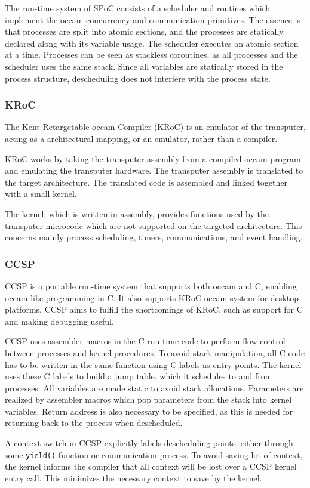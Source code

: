 The run\hyp{}time system of SPoC consists of a scheduler and routines which implement the occam concurrency and communication primitives. The essence is that processes are split into atomic sections, and the processes are statically declared along with its variable usage. The scheduler executes an atomic section at a time. Processes can be seen as stackless coroutines, as all processes and the scheduler uses the same stack. Since all variables are statically stored in the process structure, descheduling does not interfere with the process state. 


\subsubsection{KRoC}
\label{sssec:kroc}

The Kent Retargetable occam Compiler (KRoC) \citep{kroc} is an emulator of the transputer, acting as a architectural mapping, or an emulator, rather than a compiler.

KRoC works by taking the transputer assembly from a compiled occam program and emulating the transputer hardware. The transputer assembly is translated to the target architecture. The translated code is assembled and linked together with a small kernel. 

The kernel, which is written in assembly, provides functions used by the transputer microcode which are not supported on the targeted architecture. This concerns mainly process scheduling, timers, communications, and event handling.


\subsubsection{CCSP}
\label{sssec:ccsp}

CCSP \citep{ccsp} is a portable run-time system that supports both occam and C, enabling occam-like programming in C. It also supports KRoC occam system for desktop platforms. CCSP aims to fulfill the shortcomings of KRoC, such as support for C and making debugging useful.

CCSP uses assembler macros in the C run\hyp{}time code to perform flow control between processes and kernel procedures. To avoid stack manipulation, all C code has to be written in the same function using C labels as entry points. The kernel uses these C labels to build a jump table, which it schedules to and from processes. All variables are made static to avoid stack allocations. Parameters are realized by assembler macros which pop parameters from the stack into kernel variables. Return address is also necessary to be specified, as this is needed for returning back to the process when descheduled. 

A context switch in CCSP explicitly labels descheduling points, either through some \texttt{yield()} function or communication process. To avoid saving lot of context, the kernel informs the compiler that all context will be lost over a CCSP kernel entry call. This minimizes the necessary context to save by the kernel. 

